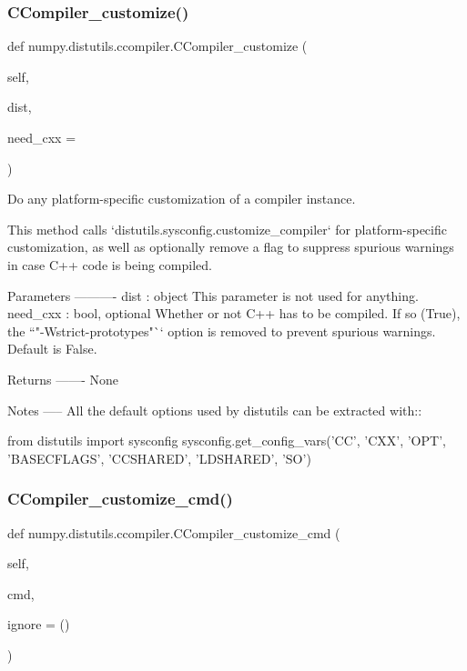 \subsubsection{\texorpdfstring{C\+Compiler\+\_\+customize()}{CCompiler\_customize()}}
{\footnotesize\ttfamily def numpy.\+distutils.\+ccompiler.\+C\+Compiler\+\_\+customize (\begin{DoxyParamCaption}\item[{}]{self,  }\item[{}]{dist,  }\item[{}]{need\+\_\+cxx = {} }\end{DoxyParamCaption})}

\begin{DoxyVerb}Do any platform-specific customization of a compiler instance.

This method calls `distutils.sysconfig.customize_compiler` for
platform-specific customization, as well as optionally remove a flag
to suppress spurious warnings in case C++ code is being compiled.

Parameters
----------
dist : object
    This parameter is not used for anything.
need_cxx : bool, optional
    Whether or not C++ has to be compiled. If so (True), the
    ``"-Wstrict-prototypes"`` option is removed to prevent spurious
    warnings. Default is False.

Returns
-------
None

Notes
-----
All the default options used by distutils can be extracted with::

  from distutils import sysconfig
  sysconfig.get_config_vars('CC', 'CXX', 'OPT', 'BASECFLAGS',
                            'CCSHARED', 'LDSHARED', 'SO')\end{DoxyVerb}
 \mbox{\label{namespacenumpy_1_1distutils_1_1ccompiler_aa3b6bde09311dab188b0dd62722a3e21}} 
\subsubsection{\texorpdfstring{C\+Compiler\+\_\+customize\+\_\+cmd()}{CCompiler\_customize\_cmd()}}
{\footnotesize\ttfamily def numpy.\+distutils.\+ccompiler.\+C\+Compiler\+\_\+customize\+\_\+cmd (\begin{DoxyParamCaption}\item[{}]{self,  }\item[{}]{cmd,  }\item[{}]{ignore = {\ttfamily ()} }\end{DoxyParamCaption})}

